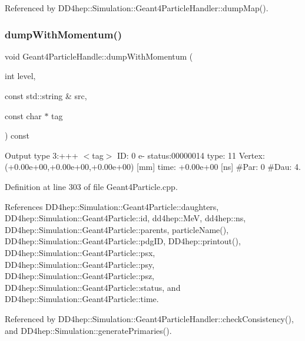 Referenced by D\+D4hep\+::\+Simulation\+::\+Geant4\+Particle\+Handler\+::dump\+Map().

\hypertarget{class_d_d4hep_1_1_simulation_1_1_geant4_particle_handle_a24105ffb9552c45d007786a8cd63899b}{}\label{class_d_d4hep_1_1_simulation_1_1_geant4_particle_handle_a24105ffb9552c45d007786a8cd63899b} 
\subsubsection{\texorpdfstring{dump\+With\+Momentum()}{dumpWithMomentum()}}
{\footnotesize\ttfamily void Geant4\+Particle\+Handle\+::dump\+With\+Momentum (\begin{DoxyParamCaption}\item[{int}]{level,  }\item[{const std\+::string \&}]{src,  }\item[{const char $\ast$}]{tag }\end{DoxyParamCaption}) const}



Output type 3\+:+++ $<$tag$>$ ID\+: 0 e-\/ status\+:00000014 type\+: 11 Vertex\+:(+0.00e+00,+0.00e+00,+0.00e+00) \mbox{[}mm\mbox{]} time\+: +0.00e+00 \mbox{[}ns\mbox{]} \#Par\+: 0 \#Dau\+: 4. 



Definition at line 303 of file Geant4\+Particle.\+cpp.



References D\+D4hep\+::\+Simulation\+::\+Geant4\+Particle\+::daughters, D\+D4hep\+::\+Simulation\+::\+Geant4\+Particle\+::id, dd4hep\+::\+MeV, dd4hep\+::ns, D\+D4hep\+::\+Simulation\+::\+Geant4\+Particle\+::parents, particle\+Name(), D\+D4hep\+::\+Simulation\+::\+Geant4\+Particle\+::pdg\+ID, D\+D4hep\+::printout(), D\+D4hep\+::\+Simulation\+::\+Geant4\+Particle\+::psx, D\+D4hep\+::\+Simulation\+::\+Geant4\+Particle\+::psy, D\+D4hep\+::\+Simulation\+::\+Geant4\+Particle\+::psz, D\+D4hep\+::\+Simulation\+::\+Geant4\+Particle\+::status, and D\+D4hep\+::\+Simulation\+::\+Geant4\+Particle\+::time.



Referenced by D\+D4hep\+::\+Simulation\+::\+Geant4\+Particle\+Handler\+::check\+Consistency(), and D\+D4hep\+::\+Simulation\+::generate\+Primaries().

